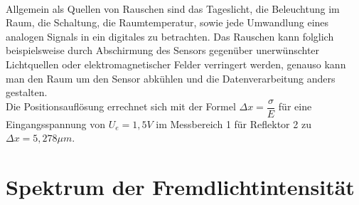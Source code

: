 ~\\
Allgemein als Quellen von Rauschen sind das Tageslicht, die Beleuchtung im Raum, die Schaltung, die Raumtemperatur, sowie jede Umwandlung eines analogen Signals in ein digitales zu betrachten. Das Rauschen kann folglich beispielsweise durch Abschirmung des Sensors gegenüber unerwünschter Lichtquellen oder elektromagnetischer Felder verringert werden, genauso kann man den Raum um den Sensor abkühlen und die Datenverarbeitung anders gestalten.
~\\
Die Positionsauflösung errechnet sich mit der Formel $\Delta x = \dfrac{\sigma}{E}$ für eine Eingangsspannung von $U_e = 1,5V$ im Messbereich 1 für Reflektor 2 zu $\Delta x = 5,278\mu m$.

\section{Spektrum der Fremdlichtintensität}

